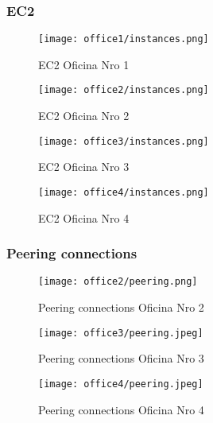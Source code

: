 \subsubsection{EC2}
\begin{figure}[H]
    \centering
    \texttt{[image: office1/instances.png]}
    \caption{EC2 Oficina Nro 1}
\end{figure}
\begin{figure}[H]
    \centering
    \texttt{[image: office2/instances.png]}
    \caption{EC2 Oficina Nro 2}
\end{figure}
\begin{figure}[H]
    \centering
    \texttt{[image: office3/instances.png]}
    \caption{EC2 Oficina Nro 3}
\end{figure}
\begin{figure}[H]
    \centering
    \texttt{[image: office4/instances.png]}
    \caption{EC2 Oficina Nro 4}
\end{figure}

\subsubsection{Peering connections}
\begin{figure}[H]
    \centering
    \texttt{[image: office2/peering.png]}
    \caption{Peering connections Oficina Nro 2}
\end{figure}
\begin{figure}[H]
    \centering
    \texttt{[image: office3/peering.jpeg]}
    \caption{Peering connections Oficina Nro 3}
\end{figure}
\begin{figure}[H]
    \centering
    \texttt{[image: office4/peering.jpeg]}
    \caption{Peering connections Oficina Nro 4}
\end{figure}